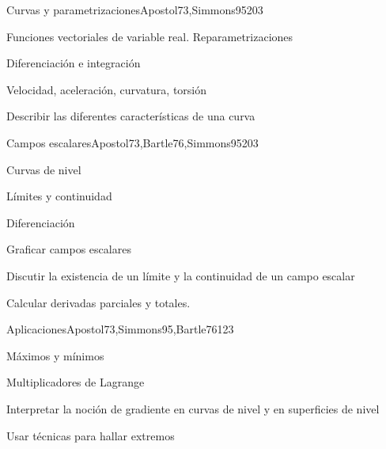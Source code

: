 \begin{syllabus}
\begin{unit}{Curvas y parametrizaciones}{Apostol73,Simmons95}{20}{3}
   \begin{topics}
      \item Funciones vectoriales de variable real. Reparametrizaciones
      \item Diferenciación e integración
      \item Velocidad, aceleración, curvatura, torsión
      \end{topics}

   \begin{learningoutcomes}
      \item Describir las diferentes características de una curva
      \end{learningoutcomes}
\end{unit}

\begin{unit}{Campos escalares}{Apostol73,Bartle76,Simmons95}{20}{3}
   \begin{topics}
      \item Curvas de nivel
      \item Límites y continuidad
      \item Diferenciación
      \end{topics}

   \begin{learningoutcomes}
      \item Graficar campos escalares
      \item Discutir la existencia de un límite y la continuidad de un campo escalar
      \item Calcular derivadas parciales y totales.
      \end{learningoutcomes}
\end{unit}

\begin{unit}{Aplicaciones}{Apostol73,Simmons95,Bartle76}{12}{3}
   \begin{topics}
      \item Máximos y mínimos
      \item Multiplicadores de Lagrange
      \end{topics}

   \begin{learningoutcomes}
      \item Interpretar la noción de gradiente en curvas de nivel y en superficies de nivel
      \item Usar técnicas para hallar extremos
      \end{learningoutcomes}
\end{unit}


\end{syllabus}
